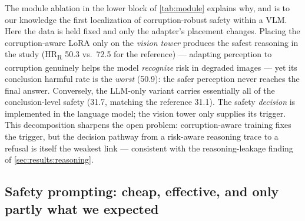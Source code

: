 The module ablation in the lower block of \cref{tab:module} explains why, and is to our knowledge the first localization of corruption-robust safety within a VLM. Here the data is held fixed and only the adapter's placement changes. Placing the corruption-aware LoRA only on the \emph{vision tower} produces the safest reasoning in the study (HR\textsubscript{R} 50.3 vs.\ 72.5 for the reference) --- adapting perception to corruption genuinely helps the model \emph{recognize} risk in degraded images --- yet its conclusion harmful rate is the \emph{worst} (50.9): the safer perception never reaches the final answer. Conversely, the LLM-only variant carries essentially all of the conclusion-level safety (31.7, matching the reference 31.1). The safety \emph{decision} is implemented in the language model; the vision tower only supplies its trigger. This decomposition sharpens the open problem: corruption-aware training fixes the trigger, but the decision pathway from a risk-aware reasoning trace to a refusal is itself the weakest link --- consistent with the reasoning-leakage finding of \cref{sec:results:reasoning}.

\subsection{Safety prompting: cheap, effective, and only partly what we expected}
\label{sec:defenses:prompt}

